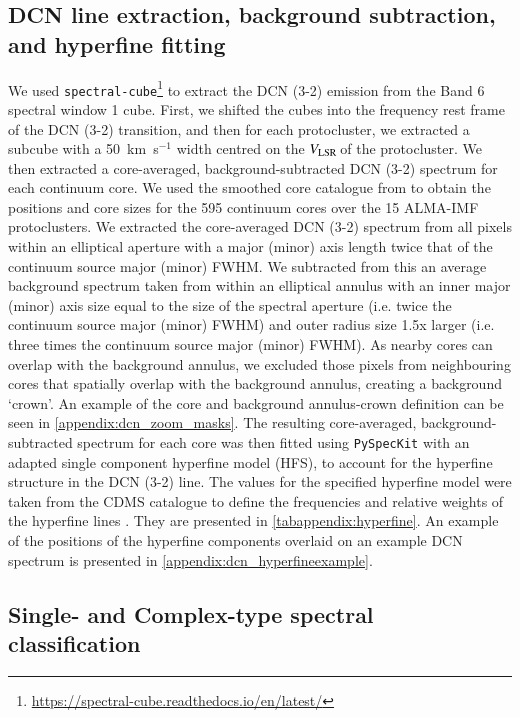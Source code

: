 \documentclass[longauth]{aa} %
\newcommand{\vlsr}{\mbox{$V_{\rm LSR}$\,}}
\newcommand{\kms}{\textrm{km~s}\ensuremath{^{-1}}\xspace}       %
\begin{document}
\begin{appendix}
\section{DCN line extraction, background subtraction, and hyperfine fitting}
\label{appendix:dcn_fitting}

 
We used \texttt{spectral-cube}\footnote{\url{https://spectral-cube.readthedocs.io/en/latest/}} \citep{Ginsburg2019b} to extract the DCN (3-2) emission from the Band 6 spectral window 1 cube. First, we shifted the cubes into the  frequency rest frame of the DCN (3-2) transition, and then for each protocluster, we extracted a subcube with a 50~\kms width centred on the \vlsr of the protocluster. We then extracted a core-averaged, background-subtracted DCN (3-2) spectrum for each continuum core. We used the smoothed core catalogue from \citet{louvet22} to obtain the positions and core sizes for the 595 continuum cores over the 15 ALMA-IMF protoclusters. We extracted the core-averaged DCN (3-2) spectrum from all pixels within an elliptical aperture with a major (minor) axis length twice that of the continuum source major (minor) FWHM. We subtracted from this an average background spectrum taken from within an elliptical annulus with an inner major (minor) axis size equal to the size of the spectral aperture (i.e. twice the continuum source major (minor) FWHM) and outer radius size 1.5x larger (i.e. three times the continuum source major (minor) FWHM).   
As nearby cores can overlap with the background annulus, we excluded those pixels from neighbouring cores that spatially overlap with the background annulus, creating a background `crown'. An example of the core and background annulus-crown definition can be seen in \cref{appendix:dcn_zoom_masks}.  
The resulting core-averaged, background-subtracted spectrum for each core was then fitted using \texttt{PySpecKit} \citep{Ginsburg2011} with an adapted single component hyperfine model (HFS), to account for the hyperfine structure in the DCN (3-2) line. The values for the specified hyperfine model were taken from the CDMS catalogue to define the frequencies and relative weights of the hyperfine lines \citep{Endres2016,muller2001,muller2005}. They are presented in \cref{tabappendix:hyperfine}. An example of the positions of the hyperfine components overlaid on an example DCN spectrum is presented in \cref{appendix:dcn_hyperfineexample}.
\label{sec:hyperfinemodel}

 
\subsection{Single- and Complex-type spectral classification}


\end{appendix}
\end{document}
